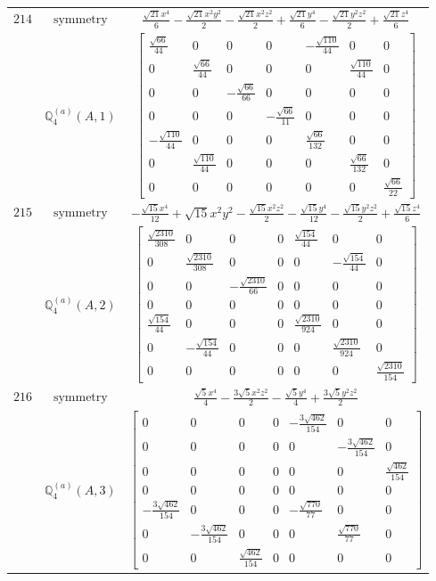 \documentclass[fleqn,8pt,landscape]{jsarticle}
\begin{document}
\begin{longtable}{ccc}
$ 214 $ & $ \text{symmetry} $ & $ \frac{\sqrt{21} x^{4}}{6} - \frac{\sqrt{21} x^{2} y^{2}}{2} - \frac{\sqrt{21} x^{2} z^{2}}{2} + \frac{\sqrt{21} y^{4}}{6} - \frac{\sqrt{21} y^{2} z^{2}}{2} + \frac{\sqrt{21} z^{4}}{6} $ \\
$  $ & $ \mathbb{Q}_{4}^{(a)}(A,1) $ & $ \begin{bmatrix} \frac{\sqrt{66}}{44} & 0 & 0 & 0 & - \frac{\sqrt{110}}{44} & 0 & 0 \\ 0 & \frac{\sqrt{66}}{44} & 0 & 0 & 0 & \frac{\sqrt{110}}{44} & 0 \\ 0 & 0 & - \frac{\sqrt{66}}{66} & 0 & 0 & 0 & 0 \\ 0 & 0 & 0 & - \frac{\sqrt{66}}{11} & 0 & 0 & 0 \\ - \frac{\sqrt{110}}{44} & 0 & 0 & 0 & \frac{\sqrt{66}}{132} & 0 & 0 \\ 0 & \frac{\sqrt{110}}{44} & 0 & 0 & 0 & \frac{\sqrt{66}}{132} & 0 \\ 0 & 0 & 0 & 0 & 0 & 0 & \frac{\sqrt{66}}{22} \end{bmatrix} $ \\ \hline
$ 215 $ & $ \text{symmetry} $ & $ - \frac{\sqrt{15} x^{4}}{12} + \sqrt{15} x^{2} y^{2} - \frac{\sqrt{15} x^{2} z^{2}}{2} - \frac{\sqrt{15} y^{4}}{12} - \frac{\sqrt{15} y^{2} z^{2}}{2} + \frac{\sqrt{15} z^{4}}{6} $ \\
$  $ & $ \mathbb{Q}_{4}^{(a)}(A,2) $ & $ \begin{bmatrix} \frac{\sqrt{2310}}{308} & 0 & 0 & 0 & \frac{\sqrt{154}}{44} & 0 & 0 \\ 0 & \frac{\sqrt{2310}}{308} & 0 & 0 & 0 & - \frac{\sqrt{154}}{44} & 0 \\ 0 & 0 & - \frac{\sqrt{2310}}{66} & 0 & 0 & 0 & 0 \\ 0 & 0 & 0 & 0 & 0 & 0 & 0 \\ \frac{\sqrt{154}}{44} & 0 & 0 & 0 & \frac{\sqrt{2310}}{924} & 0 & 0 \\ 0 & - \frac{\sqrt{154}}{44} & 0 & 0 & 0 & \frac{\sqrt{2310}}{924} & 0 \\ 0 & 0 & 0 & 0 & 0 & 0 & \frac{\sqrt{2310}}{154} \end{bmatrix} $ \\ \hline
$ 216 $ & $ \text{symmetry} $ & $ \frac{\sqrt{5} x^{4}}{4} - \frac{3 \sqrt{5} x^{2} z^{2}}{2} - \frac{\sqrt{5} y^{4}}{4} + \frac{3 \sqrt{5} y^{2} z^{2}}{2} $ \\
$  $ & $ \mathbb{Q}_{4}^{(a)}(A,3) $ & $ \begin{bmatrix} 0 & 0 & 0 & 0 & - \frac{3 \sqrt{462}}{154} & 0 & 0 \\ 0 & 0 & 0 & 0 & 0 & - \frac{3 \sqrt{462}}{154} & 0 \\ 0 & 0 & 0 & 0 & 0 & 0 & \frac{\sqrt{462}}{154} \\ 0 & 0 & 0 & 0 & 0 & 0 & 0 \\ - \frac{3 \sqrt{462}}{154} & 0 & 0 & 0 & - \frac{\sqrt{770}}{77} & 0 & 0 \\ 0 & - \frac{3 \sqrt{462}}{154} & 0 & 0 & 0 & \frac{\sqrt{770}}{77} & 0 \\ 0 & 0 & \frac{\sqrt{462}}{154} & 0 & 0 & 0 & 0 \end{bmatrix} $ \\ \hline

\end{longtable}
\end{document}
